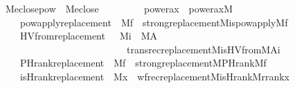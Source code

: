 \begin{isabellebody}
%
\isadelimdocument
%
\endisadelimdocument
%
\isatagdocument
%
\isamarkuptrue%
%
\endisatagdocument
{\isafolddocument}%
%
\isadelimdocument
%
\endisadelimdocument
{}\isamarkupfalse%
\ M{\isacharunderscore}{\kern0pt}eclose{\isacharunderscore}{\kern0pt}pow\ {\isacharequal}{\kern0pt}\ M{\isacharunderscore}{\kern0pt}eclose\ {\isacharplus}{\kern0pt}\ \isanewline
\ \ \isanewline
\ \ \ \ power{\isacharunderscore}{\kern0pt}ax\ {\isacharcolon}{\kern0pt}\ {\isachardoublequoteopen}power{\isacharunderscore}{\kern0pt}ax{\isacharparenleft}{\kern0pt}M{\isacharparenright}{\kern0pt}{\isachardoublequoteclose}\ \isanewline
\ \ \ \ powapply{\isacharunderscore}{\kern0pt}replacement\ {\isacharcolon}{\kern0pt}\ {\isachardoublequoteopen}M{\isacharparenleft}{\kern0pt}f{\isacharparenright}{\kern0pt}\ {\isasymLongrightarrow}\ strong{\isacharunderscore}{\kern0pt}replacement{\isacharparenleft}{\kern0pt}M{\isacharcomma}{\kern0pt}is{\isacharunderscore}{\kern0pt}powapply{\isacharparenleft}{\kern0pt}M{\isacharcomma}{\kern0pt}f{\isacharparenright}{\kern0pt}{\isacharparenright}{\kern0pt}{\isachardoublequoteclose}\ \isanewline
\ \ \ \ HVfrom{\isacharunderscore}{\kern0pt}replacement\ {\isacharcolon}{\kern0pt}\ {\isachardoublequoteopen}{\isasymlbrakk}\ M{\isacharparenleft}{\kern0pt}i{\isacharparenright}{\kern0pt}\ {\isacharsemicolon}{\kern0pt}\ M{\isacharparenleft}{\kern0pt}A{\isacharparenright}{\kern0pt}\ {\isasymrbrakk}\ {\isasymLongrightarrow}\ \isanewline
\ \ \ \ \ \ \ \ \ \ \ \ \ \ \ \ \ \ \ \ \ \ \ \ \ \ transrec{\isacharunderscore}{\kern0pt}replacement{\isacharparenleft}{\kern0pt}M{\isacharcomma}{\kern0pt}is{\isacharunderscore}{\kern0pt}HVfrom{\isacharparenleft}{\kern0pt}M{\isacharcomma}{\kern0pt}A{\isacharparenright}{\kern0pt}{\isacharcomma}{\kern0pt}i{\isacharparenright}{\kern0pt}{\isachardoublequoteclose}\ \isanewline
\ \ \ \ PHrank{\isacharunderscore}{\kern0pt}replacement\ {\isacharcolon}{\kern0pt}\ {\isachardoublequoteopen}M{\isacharparenleft}{\kern0pt}f{\isacharparenright}{\kern0pt}\ {\isasymLongrightarrow}\ strong{\isacharunderscore}{\kern0pt}replacement{\isacharparenleft}{\kern0pt}M{\isacharcomma}{\kern0pt}PHrank{\isacharparenleft}{\kern0pt}M{\isacharcomma}{\kern0pt}f{\isacharparenright}{\kern0pt}{\isacharparenright}{\kern0pt}{\isachardoublequoteclose}\ \isanewline
\ \ \ \ is{\isacharunderscore}{\kern0pt}Hrank{\isacharunderscore}{\kern0pt}replacement\ {\isacharcolon}{\kern0pt}\ {\isachardoublequoteopen}M{\isacharparenleft}{\kern0pt}x{\isacharparenright}{\kern0pt}\ {\isasymLongrightarrow}\ wfrec{\isacharunderscore}{\kern0pt}replacement{\isacharparenleft}{\kern0pt}M{\isacharcomma}{\kern0pt}is{\isacharunderscore}{\kern0pt}Hrank{\isacharparenleft}{\kern0pt}M{\isacharparenright}{\kern0pt}{\isacharcomma}{\kern0pt}rrank{\isacharparenleft}{\kern0pt}x{\isacharparenright}{\kern0pt}{\isacharparenright}{\kern0pt}{\isachardoublequoteclose}\isanewline

\end{isabellebody}
